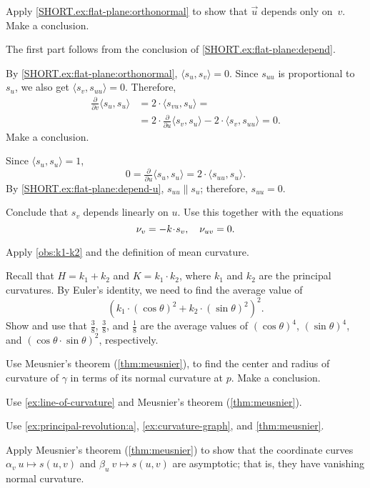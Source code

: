 \begin{multicols}{2}
Apply \ref{SHORT.ex:flat-plane:orthonormal} to show that $\vec u$ depends only on~$v$.
Make a conclusion.

The first part follows from the conclusion of \ref{SHORT.ex:flat-plane:depend}.

By \ref{SHORT.ex:flat-plane:orthonormal}, $\langle s_u,s_v\rangle=0$.
Since $s_{uu}$ is proportional to $s_u$, we also get $\langle s_{v},s_{uu}\rangle=0$.
Therefore,
\begin{align*}
\tfrac{\partial}{\partial v}\langle s_u,s_u\rangle&=2\cdot \langle s_{vu},s_u\rangle=
\\
&=2\cdot \tfrac{\partial}{\partial u}\langle s_v,s_u\rangle-2\cdot \langle s_{v},s_{uu}\rangle=0.
\end{align*}
Make a conclusion.

Since $\langle s_u,s_u\rangle=1$,
\[0=\tfrac{\partial}{\partial u}\langle s_u,s_u\rangle=2\cdot\langle s_{uu},s_u\rangle.\]
By \ref{SHORT.ex:flat-plane:depend-u}, $s_{uu}\parallel s_u$; therefore, $s_{uu}=0$.

Conclude that $s_v$ depends linearly on $u$.
Use this together with the equations
\[\Norm_v=-k\cdot s_v,\quad \Norm_{uv}=0.\]

Apply \ref{obs:k1-k2} and the definition of mean curvature.

Recall that $H=k_1+k_2$ and $K=k_1\cdot k_2$, where $k_1$ and $k_2$ are the principal curvatures.
By Euler's identity, we need to find the average value of 
\[(k_1\cdot (\cos\theta)^2+k_2\cdot (\sin\theta)^2)^2.\]
Show and use that $\tfrac38$, $\tfrac38$, and $\tfrac18$ are the average values of $(\cos\theta)^4$, $(\sin\theta)^4$, and $(\cos\theta\cdot \sin\theta)^2$, respectively.


Use Meusnier's theorem (\ref{thm:meusnier}), to find the center and radius of curvature of $\gamma$ in terms of its normal curvature at $p$.
Make a conclusion.

Use \ref{ex:line-of-curvature} and Meusnier's theorem (\ref{thm:meusnier}).

Use \ref{ex:principal-revolution:a},  \ref{ex:curvature-graph}, and \ref{thm:meusnier}.

 Apply Meusnier's theorem (\ref{thm:meusnier}) to show that the coordinate curves $\alpha_v\:u\mapsto s(u,v)$ and $\beta_u\:v\mapsto s(u,v)$ are asymptotic; that is, they have vanishing normal curvature.


\end{multicols}
